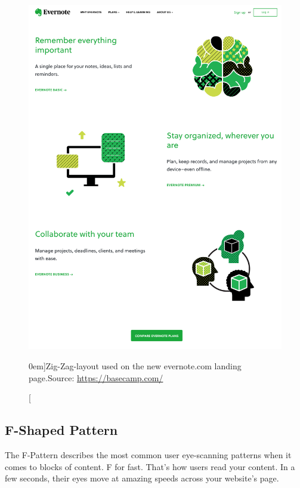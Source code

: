 \begin{figure}%
	\centering
  \includegraphics[width=1.0\textwidth]{../figures/zig-zag-shape_evernote.png}
  \caption[][0em]{Zig-Zag-layout used on the new evernote.com landing page.\newline Source: \url{https://basecamp.com/}}
  \label{fig:z-shape_facebook}
\end{figure}



\subsection{F-Shaped Pattern} %
\label{sub:f_shaped_pattern}


The F-Pattern describes the most common user eye-scanning patterns when it comes to blocks of content. F for fast. That’s how users read your content. In a few seconds, their eyes move at amazing speeds across your website's page.

